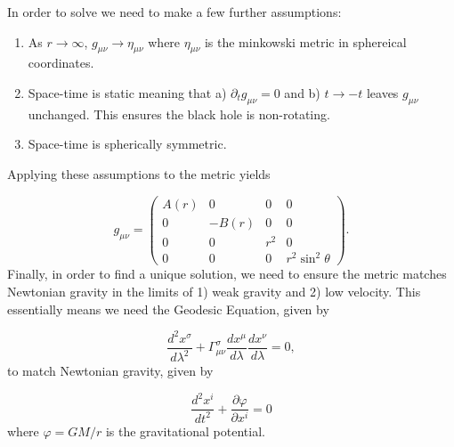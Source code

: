 \documentclass{CUP-JNL-DTM}%
\theoremstyle{definition}
\numberwithin{equation}{section}
\begin{document}
In order to solve we need to make a few further assumptions:

\begin{enumerate}
    \item As $r \rightarrow \infty$, $g_{\mu\nu} \rightarrow \eta_{\mu\nu}$ where $\eta_{\mu\nu}$ is the minkowski metric in sphereical coordinates. 
    \item Space-time is static meaning that a) $\partial_t g_{\mu\nu} = 0$ and b) $t \rightarrow -t$ leaves $g_{\mu\nu}$ unchanged. This ensures the black hole is non-rotating. 
    \item Space-time is spherically symmetric. 
\end{enumerate}
Applying these assumptions to the metric yields 

\begin{equation}
    g_{\mu\nu} = \begin{pmatrix}
        A(r) & 0 & 0 & 0 \\
        0 & -B(r) & 0 & 0 \\
        0 & 0 & r^2 & 0 \\
        0 & 0 & 0 & r^2\sin^2\theta
    \end{pmatrix}.
    \label{eqn:g_simple}
\end{equation}
Finally, in order to find a unique solution, we need to ensure the metric matches Newtonian gravity in the limits of 1) weak gravity and 2) low velocity. This essentially means we need the Geodesic Equation, given by 

\begin{equation}
    \frac{d^2 x^{\sigma}}{d\lambda^2} + \Gamma^{\sigma}_{\mu\nu} \frac{dx^{\mu}}{d\lambda}\frac{dx^{\nu}}{d\lambda} = 0,
    \label{eqn:geo}
\end{equation}
to match Newtonian gravity, given by 

\begin{equation}
    \frac{d^2x^i}{dt^2} + \frac{\partial\varphi}{\partial x^i} = 0
    \label{eqn:newton}
\end{equation}
where $\varphi = GM/r$ is the gravitational potential. 
\end{document}
